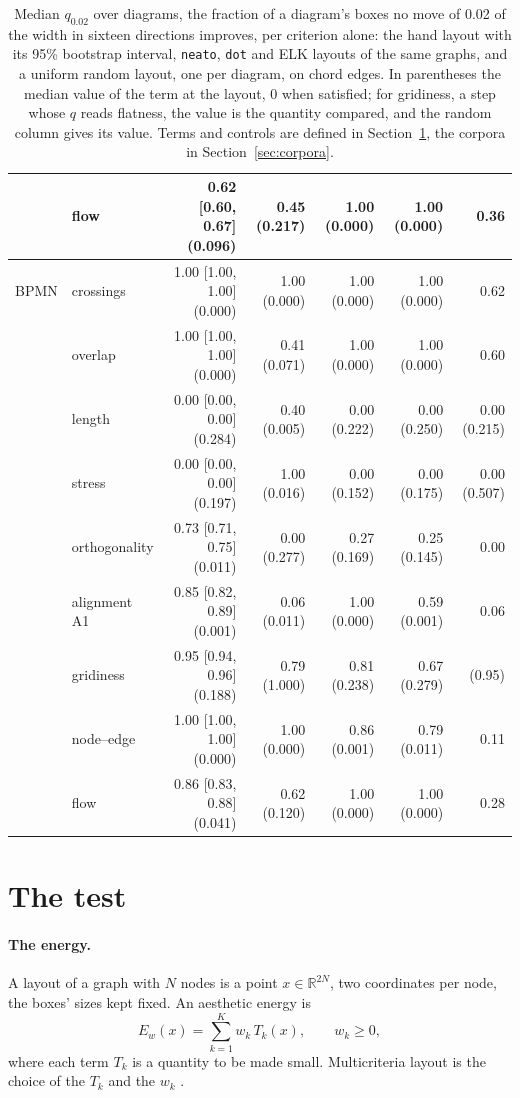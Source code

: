 \documentclass[11pt]{article}
\begin{document}
\begin{table}[!t]
\begin{tabular}{llrrrrr}
& flow & 0.62 [0.60, 0.67] (0.096) & 0.45 (0.217) & 1.00 (0.000) & 1.00 (0.000) & 0.36 \\
\midrule
BPMN & crossings & 1.00 [1.00, 1.00] (0.000) & 1.00 (0.000) & 1.00 (0.000) & 1.00 (0.000) & 0.62 \\
& overlap & 1.00 [1.00, 1.00] (0.000) & 0.41 (0.071) & 1.00 (0.000) & 1.00 (0.000) & 0.60 \\
& length & 0.00 [0.00, 0.00] (0.284) & 0.40 (0.005) & 0.00 (0.222) & 0.00 (0.250) & 0.00 (0.215) \\
& stress & 0.00 [0.00, 0.00] (0.197) & 1.00 (0.016) & 0.00 (0.152) & 0.00 (0.175) & 0.00 (0.507) \\
& orthogonality & 0.73 [0.71, 0.75] (0.011) & 0.00 (0.277) & 0.27 (0.169) & 0.25 (0.145) & 0.00 \\
& alignment A1 & 0.85 [0.82, 0.89] (0.001) & 0.06 (0.011) & 1.00 (0.000) & 0.59 (0.001) & 0.06 \\
& gridiness & 0.95 [0.94, 0.96] (0.188) & 0.79 (1.000) & 0.81 (0.238) & 0.67 (0.279) & (0.95) \\
& node--edge & 1.00 [1.00, 1.00] (0.000) & 1.00 (0.000) & 0.86 (0.001) & 0.79 (0.011) & 0.11 \\
& flow & 0.86 [0.83, 0.88] (0.041) & 0.62 (0.120) & 1.00 (0.000) & 1.00 (0.000) & 0.28 \\
\bottomrule
\end{tabular}
\caption{Median $q_{0.02}$ over diagrams, the fraction of a diagram's boxes no move of 0.02
of the width in sixteen directions improves, per criterion alone: the hand layout with its
95\% bootstrap interval, \texttt{neato}, \texttt{dot} and ELK layouts of the same graphs,
and a uniform random layout, one per diagram, on chord edges. In parentheses the median
value of the term at the layout, 0 when satisfied; for gridiness, a step whose $q$ reads flatness, the value is the quantity
compared, and the random column gives its value. Terms and controls are defined in
Section~\ref{sec:test}, the corpora in Section~\ref{sec:corpora}.}
\label{tab:profile}
\end{table}

\section{The test}\label{sec:test}



\paragraph{The energy.} A layout of a graph with $N$ nodes is a point
$x \in \mathbb{R}^{2N}$, two coordinates per node, the boxes' sizes kept fixed. An
aesthetic energy is
\begin{equation}
E_w(x) = \sum_{k=1}^{K} w_k\, T_k(x), \qquad w_k \ge 0,
\end{equation}
where each term $T_k$ is a quantity to be made small. Multicriteria layout is the choice
of the $T_k$ and the $w_k$ \cite{dh96, purchase02}.
\end{document}
